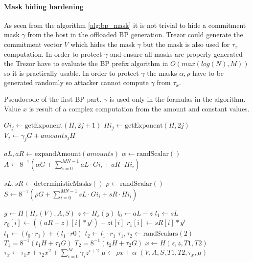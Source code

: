 \documentclass[]{article}
\begin{document}
\paragraph{Mask hiding hardening}

As seen from the algorithm \ref{alg:bp_mask} it is not trivial to hide a commitment mask $\gamma$ from the host in the offloaded BP generation. Trezor could generate the commitment vector $V$ which hides the mask $\gamma$ but the mask is also used for $\tau_x$ computation. In order to protect $\gamma$ and ensure all masks are properly generated the Trezor have to evaluate the BP prefix algorithm in $O(max(log(N), M))$ so it is practically usable. In order to protect $\gamma$ the masks $\alpha, \rho$ have to be generated randomly so attacker cannot compute $\gamma$ from $\tau_x$.

\makeatletter
{}
\makeatother

\begin{algorithm}[]
	\caption{Pseudocode of the first BP part. $\gamma$ is used only in the formulas in the algorithm. Value $x$ is result of a complex computation from the amount and constant values. } \label{alg:bp_mask}
	\begin{algorithmic}[1]
		\State {}
		\State $Gi_j \gets \text{getExponent}(H, 2j + 1)$ 	
		\State $Hi_j \gets \text{getExponent}(H, 2j)$ 	
		\State $V_j \gets \gamma_j G + amounts_j H$
		
		\State {}
		\State $aL, aR \gets \text{expandAmount}(amounts)$
		\State $\alpha \gets \text{randScalar}()$
		\State $A \gets 8^{-1} \left( \alpha G + \sum_{i=0}^{MN-1} aL \cdot Gi_i + aR \cdot Hi_i\right) $
		
		\State {}
		\State $sL, sR \gets \text{deterministicMasks}()$	
		\State $\rho \gets \text{randScalar}()$
		\State $S \gets 8^{-1} \left( \rho G + \sum_{i=0}^{MN-1} sL \cdot Gi_i + sR \cdot Hi_i\right) $
		
		\State {}
		\State $y \gets H(H_s(V), A, S)$
		\State $z \gets H_s(y)$		
		\State {}
		\State $l_0 \gets aL - z$
		\State $l_1 \gets sL$
		\State $r_0[i] \gets ((aR + z)[i] * y^{i}) + zt[i]$
		\State $r_1[i] \gets sR[i] * y^{i}$
		\State $t_1 \gets (l_0 \cdot r_1) + (l_1 \cdot r0)$ 
		\State $t_2 \gets l_1 \cdot r_1$ 
		\State
		\State $\tau_1, \tau_2 \gets \text{randScalars}(2)$
		\State $T_1 = 8^{-1} \left(t_1H + \tau_1G\right)$
		\State $T_2 = 8^{-1} \left(t_2H + \tau_2G\right)$
		\State $x \gets H(z, z, T1, T2)$ 
		\State $\tau_x \gets \tau_1 x + \tau_2 x^2 + \sum_{i=0}^{M} \gamma_i z^{i+2}$
		\State $\mu \gets \rho x + \alpha$
		\State \Return $(V, A, S, T1, T2, \tau_x, \mu)$
		\EndFunction	
	\end{algorithmic}
\end{algorithm}
\end{document}
